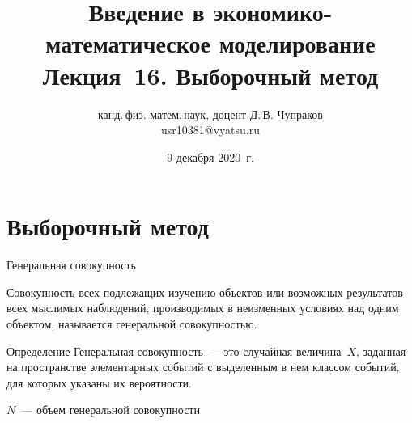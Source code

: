 \documentclass[unicode,11pt,notheorems,xcolor=table]{beamer}
\author[Д.\,В. Чупраков]{канд.\,физ.-матем.\,наук, доцент Д.\,В. Чупраков\\[6pt] usr10381@vyatsu.ru}
\institute[ВятГУ]{ФГБОУ ВО Вятский государственный университет}
\title[Лекция~16. Выборочный метод]{
	Введение в экономико-математическое моделирование\\[12pt]
	Лекция~16. Выборочный метод}
\date{9 декабря 2020~г.}
\begin{document}
\maketitle


\section{Выборочный метод}

\begin{frame}{Генеральная совокупность}

    Совокупность всех подлежащих изучению объектов или возможных результатов всех мыслимых наблюдений, производимых в неизменных условиях над одним объектом, называется \alert{генеральной совокупностью.}

    \vfill
    \begin{block}{Определение}
        \alert{Генеральная совокупность}~--- это  случайная величина~$X$, заданная на пространстве элементарных событий  с выделенным в нем классом событий, для которых указаны их вероятности.
    \end{block}

    \vfill
    $N$~--- объем генеральной совокупности
\end{frame}
\end{document}
